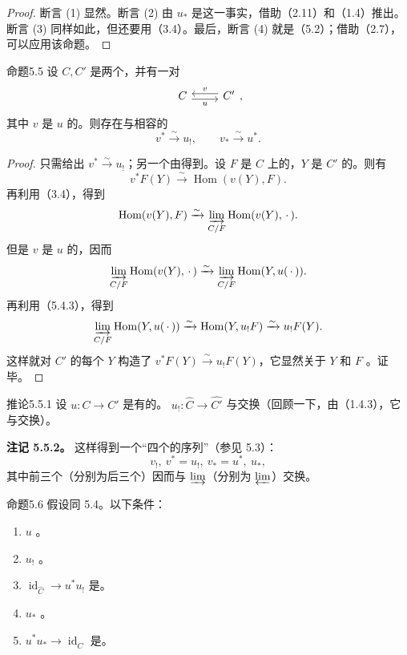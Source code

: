 \begin{proof}
断言 (1) 显然。断言 (2) 由 $u_*$ 是这一事实，借助（2.11）和（1.4）推出。断言 (3) 同样如此，但还要用（3.4）。最后，断言 (4) 就是（5.2）；借助（2.7），可以应用该命题。
\end{proof}
\begin{SGAresult}{命题}{5.5}
设 $C,C'$ 是两个，并有一对
\[\begin{tikzcd}C\arrow[r,shift right,"u"']&C'\arrow[l,shift right,"v"']\end{tikzcd},\]
其中 $v$ 是 $u$ 的。则存在与相容的
\[v^*\xrightarrow{\sim}u_!,\qquad v_*\xrightarrow{\sim}u^*.\]
\end{SGAresult}
\begin{proof}
只需给出 $v^*\xrightarrow{\sim}u_!$；另一个由得到。设 $F$ 是 $C$ 上的，$Y$ 是 $C'$ 的。则有
\[v^*F(Y)\xrightarrow{\sim}\operatorname{Hom}(v(Y),F).\]
再利用（3.4），得到
\[\operatorname{Hom}(v(Y),F)\xrightarrow{\sim}\varinjlim_{C/F}\operatorname{Hom}(v(Y),\,\cdot\,).\]
但是 $v$ 是 $u$ 的，因而
\[\varinjlim_{C/F}\operatorname{Hom}(v(Y),\,\cdot\,)\xrightarrow{\sim}\varinjlim_{C/F}\operatorname{Hom}(Y,u(\,\cdot\,)).\]
再利用（5.4.3），得到
\[\varinjlim_{C/F}\operatorname{Hom}(Y,u(\,\cdot\,))\xrightarrow{\sim}\operatorname{Hom}(Y,u_!F)\xrightarrow{\sim}u_!F(Y).\]
这样就对 $C'$ 的每个 $Y$ 构造了 $v^*F(Y)\xrightarrow{\sim}u_!F(Y)$，它显然关于 $Y$ 和 $F$ 。证毕。
\end{proof}
\begin{SGAresult}{推论}{5.5.1}
设 $u:C\to C'$ 是有的。 $u_!:\widehat C\to\widehat{C'}$ 与交换（回顾一下，由（1.4.3），它与交换）。
\end{SGAresult}
\textbf{注记 5.5.2。} 这样得到一个“四个的序列”（参见 5.3）：
\[v_!,\ v^*=u_!,\ v_*=u^*,\ u_*,\]
其中前三个（分别为后三个）因而与 $\varinjlim$（分别为 $\varprojlim$）交换。
\begin{SGAresult}{命题}{5.6}
假设同 5.4。以下条件：
\begin{enumerate}
\item[i)]  $u$ 。
\item[ii)]  $u_!$ 。
\item[iii)]  $\operatorname{id}_{\widehat C}\to u^*u_!$ 是。
\item[iv)]  $u_*$ 。
\item[v)]  $u^*u_*\to\operatorname{id}_{\widehat C}$ 是。
\end{enumerate}
\end{SGAresult}
